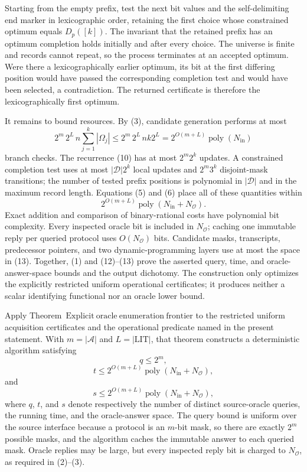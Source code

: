 Starting from the empty prefix, test the next bit values and the self-delimiting end marker in lexicographic order, retaining the first choice whose constrained optimum equals \(D_p([k])\).  The invariant that the retained prefix has an optimum completion holds initially and after every choice.  The universe is finite and records cannot repeat, so the process terminates at an accepted optimum.  Were there a lexicographically earlier optimum, its bit at the first differing position would have passed the corresponding completion test and would have been selected, a contradiction.  The returned certificate is therefore the lexicographically first optimum.

It remains to bound resources.  By (3), candidate generation performs at most
\[
  2^m\,2^L\,n\sum_{j=1}^{k}|\Omega_j|
  \leq 2^m\,2^L\,nk2^L
  =2^{O(m+L)}\operatorname{poly}(N_{\mathrm{in}}) \tag{12}
\]
branch checks.  The recurrence (10) has at most \(2^m2^k\) updates.  A constrained completion test uses at most \(|\mathcal D|2^k\) local updates and \(2^m3^k\) disjoint-mask transitions; the number of tested prefix positions is polynomial in \(|\mathcal D|\) and in the maximum record length.  Equations (5) and (6) place all of these quantities within
\[
  2^{O(m+L)}\operatorname{poly}(N_{\mathrm{in}}+N_{\mathcal O}). \tag{13}
\]
Exact addition and comparison of binary-rational costs have polynomial bit complexity.  Every inspected oracle bit is included in \(N_{\mathcal O}\); caching one immutable reply per queried protocol uses \(O(N_{\mathcal O})\) bits.  Candidate masks, transcripts, predecessor pointers, and two dynamic-programming layers use at most the space in (13).  Together, (1) and (12)--(13) prove the asserted query, time, and oracle-answer-space bounds and the output dichotomy.  The construction only optimizes the explicitly restricted uniform operational certificates; it produces neither a scalar identifying functional nor an oracle lower bound.

Apply Theorem~\(\mathrm{Explicit\ oracle\ enumeration\ frontier}\) to the restricted uniform acquisition certificates and the operational predicate named in the present statement.  With \(m=|\mathcal A|\) and \(L=|\mathrm{LIT}|\), that theorem constructs a deterministic algorithm satisfying
\[
  q\leq 2^m, \tag{1}
\]
\[
  t\leq 2^{O(m+L)}\operatorname{poly}(N_{\mathrm{in}}+N_{\mathcal O}), \tag{2}
\]
and
\[
  s\leq 2^{O(m+L)}\operatorname{poly}(N_{\mathrm{in}}+N_{\mathcal O}), \tag{3}
\]
where \(q\), \(t\), and \(s\) denote respectively the number of distinct source-oracle queries, the running time, and the oracle-answer space.  The query bound is uniform over the source interface because a protocol is an \(m\)-bit mask, so there are exactly \(2^m\) possible masks, and the algorithm caches the immutable answer to each queried mask.  Oracle replies may be large, but every inspected reply bit is charged to \(N_{\mathcal O}\), as required in (2)--(3).

